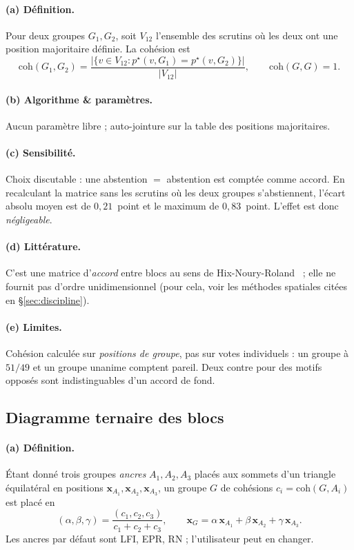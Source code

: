 \documentclass[11pt,a4paper]{article}
\begin{document}
\paragraph{(a) Définition.} Pour deux groupes $G_1,G_2$, soit $V_{12}$ l'ensemble
des scrutins où les deux ont une position majoritaire définie. La cohésion est
\[
\mathrm{coh}(G_1,G_2)=\frac{\big|\{v\in V_{12}:p^\star(v,G_1)=p^\star(v,G_2)\}\big|}{|V_{12}|},
\qquad \mathrm{coh}(G,G)=1.
\]

\paragraph{(b) Algorithme \& paramètres.} Aucun paramètre libre ; auto-jointure
sur la table des positions majoritaires.

\paragraph{(c) Sensibilité.} Choix discutable : une \og{}abstention $=$ abstention\fg{}
est comptée comme accord. En recalculant la matrice sans les scrutins où les deux
groupes s'abstiennent, l'écart absolu moyen est de $0{,}21$~point et le maximum de
$0{,}83$~point. L'effet est donc \emph{négligeable}.

\paragraph{(d) Littérature.} C'est une matrice d'\emph{accord} entre blocs au sens
de Hix-Noury-Roland~\cite{hnr2007} ; elle ne fournit pas d'ordre unidimensionnel
(pour cela, voir les méthodes spatiales citées en §\ref{sec:discipline}).

\paragraph{(e) Limites.} Cohésion calculée sur \emph{positions de groupe}, pas sur
votes individuels : un groupe à $51/49$ et un groupe unanime comptent pareil. Deux
\og{}contre\fg{} pour des motifs opposés sont indistinguables d'un accord de fond.

\subsection{Diagramme ternaire des blocs}\label{sec:ternaire}

\paragraph{(a) Définition.} Étant donné trois groupes \emph{ancres} $A_1,A_2,A_3$
placés aux sommets d'un triangle équilatéral en positions $\mathbf{x}_{A_1},\mathbf{x}_{A_2},\mathbf{x}_{A_3}$,
un groupe $G$ de cohésions $c_i=\mathrm{coh}(G,A_i)$ est placé en
\[
(\alpha,\beta,\gamma)=\frac{(c_1,c_2,c_3)}{c_1+c_2+c_3},\qquad
\mathbf{x}_G=\alpha\,\mathbf{x}_{A_1}+\beta\,\mathbf{x}_{A_2}+\gamma\,\mathbf{x}_{A_3}.
\]
Les ancres par défaut sont LFI, EPR, RN ; l'utilisateur peut en changer.
\end{document}
